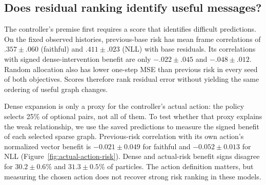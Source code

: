 \subsection{Does residual ranking identify useful messages?}
The controller's premise first requires a score that identifies difficult predictions. On the fixed observed histories, previous-base risk has mean frame correlations of $.357\pm.060$ (faithful) and $.411\pm.023$ (NLL) with base residuals. Its correlations with signed dense-intervention benefit are only $-.022\pm.045$ and $-.048\pm.012$. Random allocation also has lower one-step MSE than previous risk in every seed of both objectives. Scores therefore rank residual error without yielding the same ordering of useful graph changes.

Dense expansion is only a proxy for the controller's actual action: the policy selects 25\% of optional pairs, not all of them. To test whether that proxy explains the weak relationship, we use the saved predictions to measure the signed benefit of each selected sparse graph. Previous-risk correlation with its own action's normalized vector benefit is $-0.021\pm0.049$ for faithful and $-0.052\pm0.013$ for NLL (Figure~\ref{fig:actual-action-risk}). Dense and actual-risk benefit signs disagree for $30.2\pm0.6$\% and $31.3\pm0.5$\% of particles. The action definition matters, but measuring the chosen action does not recover strong risk ranking in these models.

